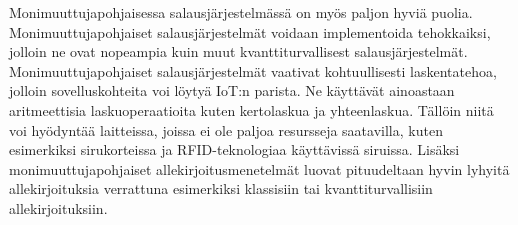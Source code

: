 Monimuuttujapohjaisessa salausjärjestelmässä on myös paljon hyviä puolia. Monimuuttujapohjaiset salausjärjestelmät voidaan implementoida tehokkaiksi, jolloin ne ovat nopeampia kuin muut kvanttiturvallisest salausjärjestelmät. Monimuuttujapohjaiset salausjärjestelmät vaativat kohtuullisesti laskentatehoa, jolloin sovelluskohteita voi löytyä IoT:n parista. Ne käyttävät ainoastaan aritmeettisia laskuoperaatioita kuten kertolaskua ja yhteenlaskua. Tällöin niitä voi hyödyntää laitteissa, joissa ei ole paljoa resursseja saatavilla, kuten esimerkiksi sirukorteissa ja RFID-teknologiaa käyttävissä siruissa. Lisäksi monimuuttujapohjaiset allekirjoitusmenetelmät luovat pituudeltaan hyvin lyhyitä allekirjoituksia verrattuna esimerkiksi klassisiin tai kvanttiturvallisiin allekirjoituksiin.